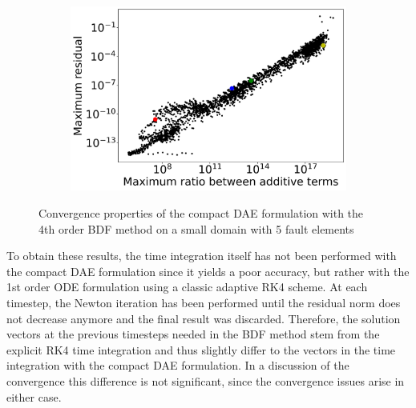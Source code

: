 \begin{figure}[H]
\begin{subfigure}[t]{0.32\textwidth}
		\includegraphics[width=1\textwidth]{images/TANDEMConvergenceAnalysisCompactDAERatioInAddition_Size5.png}
		\label{fig:convergenceIssuesCompactDAEMaxResidual_vs_ratio}
	\end{subfigure}
	\caption{Convergence properties of the compact DAE formulation with the 4th order BDF method on a small domain with 5 fault elements}
\end{figure}
To obtain these results, the time integration itself has not been performed with the compact DAE formulation since it yields a poor accuracy, but rather with the 1st order ODE formulation using a classic adaptive RK4 scheme. At each timestep, the Newton iteration has been performed until the residual norm does not decrease anymore and the final result was discarded. Therefore, the solution vectors at the previous timesteps needed in the BDF method stem from the explicit RK4 time integration and thus slightly differ to the vectors in the time integration with the compact DAE formulation. In a discussion of the convergence this difference is not significant, since the convergence issues arise in either case. \\

